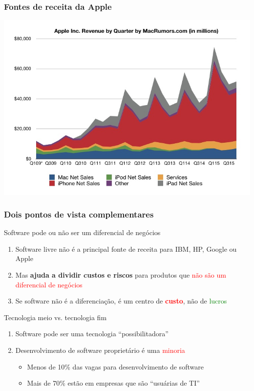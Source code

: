 \documentclass[xcolor=dvipsnames]{beamer}
\newcommand{\tred}[1]{\textcolor{red}{#1}}
\newcommand{\tgreen}[1]{\textcolor{green}{#1}}
\begin{document}
\begin{frame}
	\frametitle{Fontes de receita da Apple}
 	\includegraphics[scale=0.38]{apple_revenue.jpg}	
\end{frame}


\begin{frame}
	\frametitle{Dois pontos de vista complementares}
	\begin{block}{Software pode ou não ser um diferencial de negócios}
	\begin{enumerate}
	\item Software livre não é a principal fonte de receita para IBM, HP, Google ou Apple\vspace{0.1cm}
	\item Mas \textbf{ajuda a dividir custos e riscos} para produtos que \tred{não são um diferencial de negócios}\vspace{0.1cm}\pause
	\item Se software não é a diferenciação, é um centro de \textbf{\tred{custo}}, não de \tgreen{lucros}
	\end{enumerate}
	\end{block}
\pause
	\begin{block}{Tecnologia meio vs. tecnologia fim}
	\begin{enumerate}
	\item Software pode ser uma tecnologia ``possibilitadora'' \vspace{0.1cm}
	\item Desenvolvimento de software proprietário é uma \tred{minoria}
	  \begin{itemize}
	  \item Menos de 10\% das vagas para desenvolvimento de software\vspace{0.1cm}
	  \item Mais de 70\% estão em empresas que são ``usuárias de TI''
	  \end{itemize}  
	\end{enumerate}
	\end{block}
\end{frame}
\end{document}
